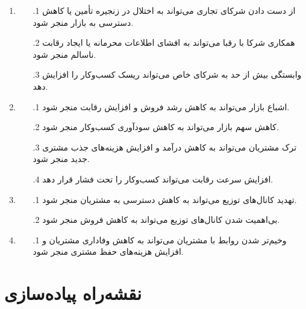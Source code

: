 \documentclass[dvipsnames, svgnames, x11names, 11pt]{article}
\begin{document}
\begin{enumerate}
\item {}
\begin{itemize}
\item[\theenumi$.$1]
از دست دادن شرکای تجاری می‌تواند به اختلال در زنجیره تأمین یا کاهش دسترسی به بازار منجر شود.
\item[\theenumi$.$2]
همکاری شرکا با رقبا می‌تواند به افشای اطلاعات محرمانه یا ایجاد رقابت ناسالم منجر شود.
\item[\theenumi$.$3]
وابستگی بیش از حد به شرکای خاص می‌تواند ریسک کسب‌وکار را افزایش دهد.
\end{itemize}

\item {}
\begin{itemize}
\item[\theenumi$.$1]
اشباع بازار می‌تواند به کاهش رشد فروش و افزایش رقابت منجر شود.
\item[\theenumi$.$2]
کاهش سهم بازار می‌تواند به کاهش سودآوری کسب‌وکار منجر شود.
\item[\theenumi$.$3]
ترک مشتریان می‌تواند به کاهش درآمد و افزایش هزینه‌های جذب مشتری جدید منجر شود.
\item[\theenumi$.$4]
افزایش سرعت رقابت می‌تواند کسب‌وکار را تحت فشار قرار دهد.
\end{itemize}

\item {}
\begin{itemize}
\item[\theenumi$.$1]
تهدید کانال‌های توزیع می‌تواند به کاهش دسترسی به مشتریان منجر شود.
\item[\theenumi$.$2]
بی‌اهمیت شدن کانال‌های توزیع می‌تواند به کاهش فروش منجر شود.
\end{itemize}

\item {}
\begin{itemize}
\item[\theenumi$.$1]
وخیم‌تر شدن روابط با مشتریان می‌تواند به کاهش وفاداری مشتریان و افزایش هزینه‌های حفظ مشتری منجر شود.
\end{itemize}
\end{enumerate}

\section{نقشه‌راه پیاده‌سازی}
\end{document}
